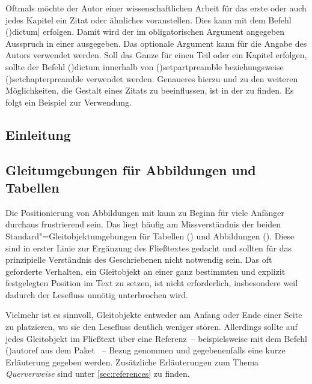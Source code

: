 \documentclass[%
  english,ngerman,%
  cdgeometry=no,DIV=12,%
  cd=false,cdfont=false,cdtitle=true,%
  headings=normal,%
  automark,%
  listof=toc,%
]{tudscrartcl}
\begin{document}
\renewcommand*\dictumwidth{.4\textwidth}%
%
\bigskip\noindent
Oftmals möchte der Autor einer wissenschaftlichen Arbeit für das erste oder 
auch jedes Kapitel ein Zitat oder ähnliches voranstellen. Dies kann mit dem 
Befehl \Macro(){dictum|}
erfolgen. Damit wird der im obligatorischen Argument angegeben Ausspruch in 
einer  ausgegeben. Das optionale Argument kann für die Angabe des 
Autors verwendet werden. Soll das Ganze für einen Teil oder ein Kapitel 
erfolgen, sollte der Befehl \Macro(){dictum} innerhalb von 
\Macro(){setpartpreamble} beziehungsweise 
\Macro(){setchapterpreamble} verwendet werden. Genaueres 
hierzu und zu den weiteren Möglichkeiten, die Gestalt eines Zitats zu 
beeinflussen, ist in der  zu finden. Es 
folgt ein Beispiel zur Verwendung.
%
\begin{Hint}
\chapter{Einleitung}

\end{Hint}



\section{%
  Gleitumgebungen für Abbildungen und Tabellen%
  \label{sec:floats}%
}

Die Positionierung von Abbildungen mit  kann zu Beginn für 
viele Anfänger durchaus frustrierend sein. Das liegt häufig am Missverständnis 
der beiden Standard"=Gleitobjektumgebungen für Tabellen () 
und Abbildungen (). Diese sind in erster Linie zur 
Ergänzung des Fließtextes gedacht und sollten für das prinzipielle Verständnis 
des Geschriebenen nicht notwendig sein. Das oft geforderte Verhalten, ein 
Gleitobjekt an einer ganz bestimmten und explizit festgelegten Position im Text 
zu setzen, ist nicht erforderlich, insbesondere weil dadurch der Lesefluss 
unnötig unterbrochen wird. 

Vielmehr ist es sinnvoll, Gleitobjekte entweder am Anfang oder Ende einer Seite 
zu platzieren, wo sie den Lesefluss deutlich weniger stören. Allerdings sollte 
auf jedes Gleitobjekt im Fließtext über eine Referenz~-- beispielsweise mit dem 
Befehl \Macro(){autoref} aus dem Paket ~-- 
Bezug genommen und gegebenenfalls eine kurze Erläuterung gegeben werden. 
Zusätzliche Erläuterungen zum Thema \emph{Querverweise} sind unter 
\autoref{sec:references} zu finden.
\end{document}
